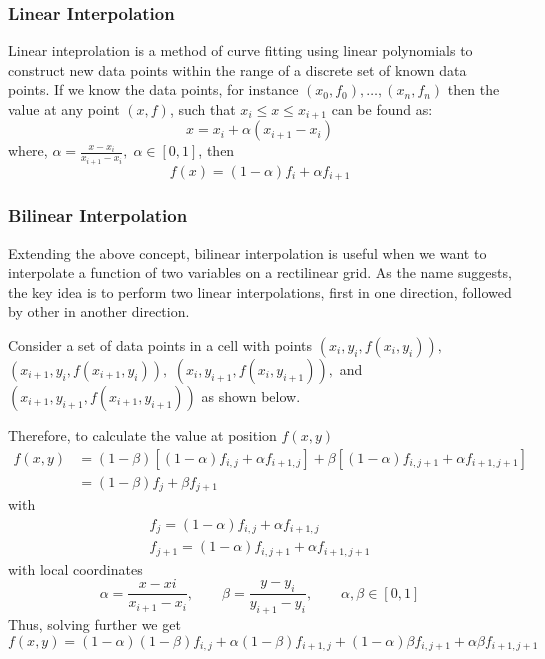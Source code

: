 \subsubsection{Linear Interpolation} Linear inteprolation is a method of curve fitting using linear polynomials to construct new data points within the range of a discrete set of known data points.
If we know the data points, for instance $ (x_{0}, f_{0}),\ldots,(x_{n}, f_{n})  $ then the value at any point $(x,f)$, such that $ x_{i} \leq x \leq x_{i+1} $ can be found as:
\begin{equation}
	x = x_{i} + \alpha (x_{i+1} - x_{i}) 
\end{equation}
where, $ \alpha = \frac{x - x_{i}}{x_{i+1}-x_{i}}, \; \alpha \in [0,1]$, then
\begin{equation}
	f(x) = (1 - \alpha) f_{i} + \alpha f_{i+1}
\end{equation}

\subsubsection{Bilinear Interpolation}
Extending the above concept, bilinear interpolation is useful when we want to interpolate a function of two variables on a rectilinear grid. As the name suggests, the key idea is to perform two linear interpolations, first in one direction, followed by other in another direction.

Consider a set of data points in a cell with points $ (x_{i},y_{i},f(x_{i},y_{i})),$ $(x_{i+1},y_{i},f(x_{i+1},y_{i})),$ $ (x_{i},y_{i+1},f(x_{i},y_{i+1})),$ and $ (x_{i+1},y_{i+1},f(x_{i+1},y_{i+1})) $ as shown below. 

Therefore, to calculate the value at position $ f(x,y) $
\begin{equation}
\begin{split}
	f(x,y) & = (1 - \beta)[(1-\alpha) f_{i,j} + \alpha f_{i+1,j}] + \beta [(1 - \alpha)f_{i,j+1} + \alpha f_{i+1, j+1}] \\
	& = (1 - \beta)f_{j} + \beta f_{j+1}
\end{split}
\end{equation}
with
\begin{equation}
\begin{split}
f_{j} = ( 1 - \alpha)f_{i,j} + \alpha f_{i+1,j} \\
f_{j+1} = (1 - \alpha) f_{i, j+1} + \alpha f_{i+1, j+1}
\end{split}
\end{equation}
with local coordinates
\begin{equation}
	\alpha = \frac{x-x{i}}{x_{i+1} - x_{i}}, \qquad \beta = \frac{y - y_{i}}{y_{i+1} - y_{i}}, \qquad \alpha, \beta \in [0,1]
\end{equation}
Thus, solving further we get
\begin{equation}
	f(x,y) = (1 -\alpha)(1-\beta)f_{i,j} + \alpha(1 - \beta)f_{i+1,j} + (1 -\alpha)\beta f_{i,j+1} + \alpha \beta f_{i+1,j+1}
\end{equation}

